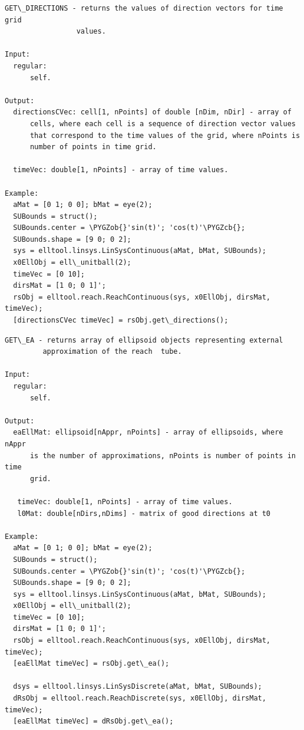 \documentclass[letterpaper,10pt,english]{sphinxmanual}
\def\PYGZob{\char`\{}
\def\PYGZcb{\char`\}}
\begin{document}
\begin{Verbatim}[commandchars=\\\{\}]
GET\_DIRECTIONS - returns the values of direction vectors for time grid
                 values.

Input:
  regular:
      self.

Output:
  directionsCVec: cell[1, nPoints] of double [nDim, nDir] - array of
      cells, where each cell is a sequence of direction vector values
      that correspond to the time values of the grid, where nPoints is
      number of points in time grid.

  timeVec: double[1, nPoints] - array of time values.

Example:
  aMat = [0 1; 0 0]; bMat = eye(2);
  SUBounds = struct();
  SUBounds.center = \PYGZob{}'sin(t)'; 'cos(t)'\PYGZcb{};
  SUBounds.shape = [9 0; 0 2];
  sys = elltool.linsys.LinSysContinuous(aMat, bMat, SUBounds);
  x0EllObj = ell\_unitball(2);
  timeVec = [0 10];
  dirsMat = [1 0; 0 1]';
  rsObj = elltool.reach.ReachContinuous(sys, x0EllObj, dirsMat, timeVec);
  [directionsCVec timeVec] = rsObj.get\_directions();
\end{Verbatim}

\begin{Verbatim}[commandchars=\\\{\}]
GET\_EA - returns array of ellipsoid objects representing external
         approximation of the reach  tube.

Input:
  regular:
      self.

Output:
  eaEllMat: ellipsoid[nAppr, nPoints] - array of ellipsoids, where nAppr
      is the number of approximations, nPoints is number of points in time
      grid.

   timeVec: double[1, nPoints] - array of time values.
   l0Mat: double[nDirs,nDims] - matrix of good directions at t0

Example:
  aMat = [0 1; 0 0]; bMat = eye(2);
  SUBounds = struct();
  SUBounds.center = \PYGZob{}'sin(t)'; 'cos(t)'\PYGZcb{};
  SUBounds.shape = [9 0; 0 2];
  sys = elltool.linsys.LinSysContinuous(aMat, bMat, SUBounds);
  x0EllObj = ell\_unitball(2);
  timeVec = [0 10];
  dirsMat = [1 0; 0 1]';
  rsObj = elltool.reach.ReachContinuous(sys, x0EllObj, dirsMat, timeVec);
  [eaEllMat timeVec] = rsObj.get\_ea();

  dsys = elltool.linsys.LinSysDiscrete(aMat, bMat, SUBounds);
  dRsObj = elltool.reach.ReachDiscrete(sys, x0EllObj, dirsMat, timeVec);
  [eaEllMat timeVec] = dRsObj.get\_ea();
\end{Verbatim}
\end{document}
